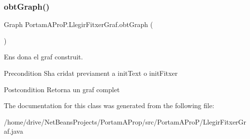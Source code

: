 \subsubsection{\texorpdfstring{obt\+Graph()}{obtGraph()}}
{\footnotesize\ttfamily Graph Portam\+A\+Pro\+P.\+Llegir\+Fitxer\+Graf.\+obt\+Graph (\begin{DoxyParamCaption}{ }\end{DoxyParamCaption})}



Ens dona el graf construit. 

\begin{DoxyPrecond}{Precondition}
S\textquotesingle{}ha cridat previament a init\+Text o init\+Fitxer 
\end{DoxyPrecond}
\begin{DoxyPostcond}{Postcondition}
Retorna un graf complet 
\end{DoxyPostcond}


The documentation for this class was generated from the following file\+:\begin{DoxyCompactItemize}
\item 
/home/drive/\+Net\+Beans\+Projects/\+Portam\+A\+Prop/src/\+Portam\+A\+Pro\+P/Llegir\+Fitxer\+Graf.\+java\end{DoxyCompactItemize}
